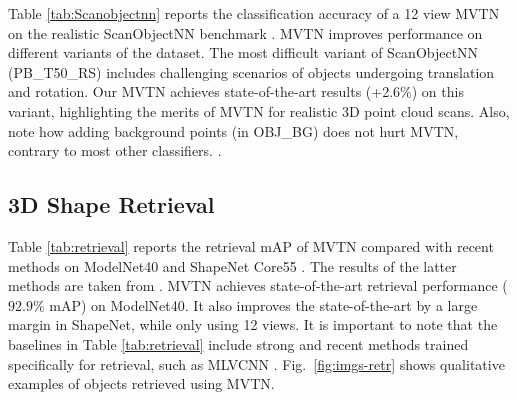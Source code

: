 \documentclass[10pt,twocolumn,letterpaper]{article}
\newcommand{\figLabel}{Fig.~}
\begin{document}
Table \ref{tab:Scanobjectnn} reports the classification accuracy of a 12 view MVTN on the realistic ScanObjectNN benchmark \cite{scanobjectnn}. MVTN improves performance on different variants of the dataset. The most difficult variant of ScanObjectNN (PB\_T50\_RS) includes challenging scenarios of objects undergoing translation and rotation. Our MVTN achieves state-of-the-art results (+2.6\%) on this variant, highlighting the merits of MVTN for realistic 3D point cloud scans. Also, note how adding background points (in OBJ\_BG) does not hurt MVTN, contrary to most other classifiers. . 


\subsection{3D Shape Retrieval} 
\label{sec:exp-retr}
Table \ref{tab:retrieval} reports the retrieval mAP of MVTN compared with recent methods on ModelNet40 \cite{modelnet} and ShapeNet Core55 \cite{shapenet}. The results of the latter methods are taken from \cite{mlvcnn,mvviewgcn,pvnet}. 
MVTN achieves state-of-the-art retrieval performance ($92.9\%$ mAP) on ModelNet40. It also improves the state-of-the-art by a large margin in ShapeNet, while only using 12 views. It is important to note that the baselines in Table \ref{tab:retrieval} include strong and recent methods trained specifically for retrieval, such as MLVCNN \cite{mlvcnn}.
 \figLabel{\ref{fig:imgs-retr}} shows qualitative examples of objects retrieved using MVTN.


\begin{table}[t]

\tabcolsep=0.3cm
\centering
{}
\vspace{2pt}
\caption{\small \textbf{Rotation Robustness on ModelNet40.} 
At test time, we randomly rotate objects in ModelNet40 around the Y-axis (gravity) with different ranges and report the overall accuracy. MVTN displays strong robustness to such Y-rotations.}
\label{tbl:y-robustness}
\end{table}
\end{document}
